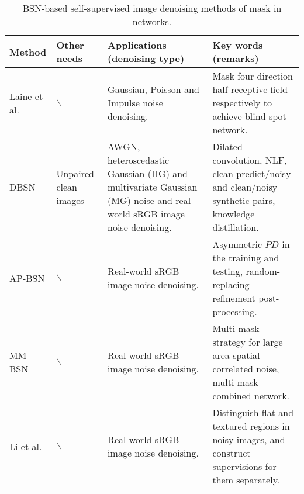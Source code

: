 \documentclass[conference]{IEEEtran}
\begin{document}
\begin{table*}[t]
	\setlength{\abovecaptionskip}{0cm}
	\setlength{\belowcaptionskip}{0cm}
	\caption{BSN-based self-supervised image denoising methods of mask in networks.}
	\centering
	\begin{tabular}{|m{2.2cm}<{\raggedright}|m{2cm}<{\raggedright}|m{4cm}<{\raggedright}|m{7.5cm}<{\raggedright}|}
		\hline
		Method&	Other needs	&Applications (denoising type)	&Key words (remarks)\\
		\hline
		Laine et al.\cite{laine2019high}&	$\backslash$	&Gaussian, Poisson and Impulse noise denoising.&	Mask four direction half receptive field respectively to achieve blind spot network.\\
		\hline
		DBSN \cite{wu2020unpaired}&	Unpaired clean images&	AWGN, heteroscedastic Gaussian (HG) and multivariate Gaussian (MG) noise and real-world sRGB image noise denoising.	&Dilated convolution, NLF, clean\underline{ }predict/noisy and clean/noisy\underline{ }synthetic pairs, knowledge distillation.\\
		\hline
		AP-BSN\cite{lee2022ap}&	$\backslash$	&Real-world sRGB image noise denoising.&	Asymmetric $PD$ in the training and testing, random-replacing refinement post-processing.\\
		\hline
		MM-BSN\cite{zhang2023mm}&	$\backslash$	&Real-world sRGB image noise denoising.&	Multi-mask strategy for large area spatial correlated noise, multi-mask combined network.\\
		\hline
		Li et al.\cite{li2023spatially}&	$\backslash$	&Real-world sRGB image noise denoising.&	Distinguish flat and textured regions in noisy images, and construct supervisions for them separately.\\
		\hline
	\end{tabular}
	\setlength{\belowcaptionskip}{-0.5cm}
	\label{tab:mask_in_networks}
\vspace{-2em}
\end{table*}
\end{document}
